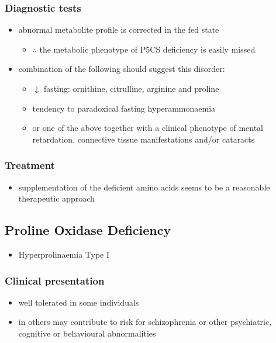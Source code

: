 \documentclass{scrartcl}
\begin{document}
\subsubsection{Diagnostic tests}
\label{sec:org9dbd117}
\begin{itemize}
\item abnormal metabolite profile is corrected in the fed state
\begin{itemize}
\item \(\therefore\) the metabolic phenotype of P5CS deficiency is easily
missed
\end{itemize}
\item combination of the following should suggest this disorder:
\begin{itemize}
\item \(\downarrow\) fasting: ornithine, citrulline, arginine and proline
\item tendency to paradoxical fasting hyperammonaemia
\item or one of the above together with a clinical phenotype of mental
retardation, connective tissue manifestations and/or cataracts
\end{itemize}
\end{itemize}

\subsubsection{Treatment}
\label{sec:orga1f45b3}
\begin{itemize}
\item supplementation of the deficient amino acids seems to be a
reasonable therapeutic approach
\end{itemize}

\subsection{Proline Oxidase Deficiency}
\label{sec:org706df6d}
\begin{itemize}
\item Hyperprolinaemia Type I
\end{itemize}
\subsubsection{Clinical presentation}
\label{sec:org85ddf1c}
\begin{itemize}
\item well tolerated in some individuals
\item in others may contribute to risk for schizophrenia or other
psychiatric, cognitive or behavioural abnormalities
\end{itemize}
\end{document}
